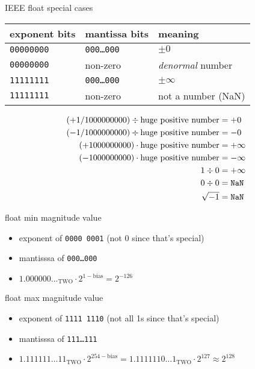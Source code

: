 \begin{frame}{IEEE float special cases}
\begin{tabular}{llp{5cm}}
exponent bits & mantissa bits & meaning \\ \hline
{\tt 00000000} & {\tt 000\ldots000} & $\pm 0$\\
{\tt 00000000} & non-zero & \textit{denormal} number \\
{\tt 11111111} & {\tt 000\ldots000} & $\pm \infty$ \\
{\tt 11111111} & non-zero & not a number (NaN) \\
\end{tabular}
\small
\begin{eqnarray*}
(+1/1000000000) \div \text{huge positive number} &= +0 \\
(-1/1000000000) \div \text{huge positive number} &= -0 \\
(+1000000000) \cdot \text{huge positive number} &= +\infty \\
(-1000000000) \cdot \text{huge positive number} &= -\infty \\
1 \div 0 &= +\infty \\
0 \div 0 &= \text{\tt NaN} \\ \sqrt{-1} &= \text{\tt NaN} \\
\end{eqnarray*}
\end{frame}

\begin{frame}{float min magnitude value}
\begin{itemize}
\item exponent of {\tt 0000 0001}  (not 0 since that's special)
\item mantisssa of {\tt 000\ldots000}
\item $1.000000\ldots_\text{TWO} \cdot 2^{1-\text{bias}} = 2^{-126}$
\end{itemize}
\end{frame}

\begin{frame}{float max magnitude value}
\begin{itemize}
\item exponent of {\tt 1111 1110}  (not all 1s since that's special) 
\item mantisssa of {\tt 111\ldots111}
\item $1.111111\ldots11_\text{TWO} \cdot 2^{254-\text{bias}} = 1.1111110\ldots1_\text{TWO} \cdot 2^{127} \approx 2^{128}$
\end{itemize}
\end{frame}

